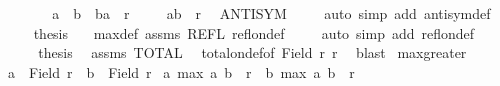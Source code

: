 \begin{isabellebody}
\isanewline
\ \ \isamarkupfalse%
\isanewline
\ \ \isacommand{{\isacharbraceleft}{\kern0pt}}\isamarkupfalse%
\isamarkupfalse%
\ {\isacharasterisk}{\kern0pt}{\isacharcolon}{\kern0pt}\ {\isachardoublequoteopen}a\ {\isasymnoteq}\ b\ {\isasymand}\ {\isacharparenleft}{\kern0pt}b{\isacharcomma}{\kern0pt}a{\isacharparenright}{\kern0pt}\ {\isasymin}\ r{\isachardoublequoteclose}\isanewline
\ \ \ \isamarkupfalse%
\ {\isachardoublequoteopen}{\isacharparenleft}{\kern0pt}a{\isacharcomma}{\kern0pt}b{\isacharparenright}{\kern0pt}\ {\isasymnotin}\ r{\isachardoublequoteclose}\ \isamarkupfalse%
\ ANTISYM\isanewline
\ \ \ \isamarkupfalse%
\ {\isacharparenleft}{\kern0pt}auto\ simp\ add{\isacharcolon}{\kern0pt}\ antisym{\isacharunderscore}{\kern0pt}def{\isacharparenright}{\kern0pt}\isanewline
\ \ \ \isamarkupfalse%
\ {\isacharquery}{\kern0pt}thesis\ \isamarkupfalse%
\ {\isacharasterisk}{\kern0pt}\ max{}{\isacharunderscore}{\kern0pt}def\ assms\ REFL\ refl{\isacharunderscore}{\kern0pt}on{\isacharunderscore}{\kern0pt}def\isanewline
\ \ \ \isamarkupfalse%
\ {\isacharparenleft}{\kern0pt}auto\ simp\ add{\isacharcolon}{\kern0pt}\ refl{\isacharunderscore}{\kern0pt}on{\isacharunderscore}{\kern0pt}def{\isacharparenright}{\kern0pt}\isanewline
\ \ \isacommand{{\isacharbraceright}{\kern0pt}}\isamarkupfalse%
\isanewline
\ \ \isamarkupfalse%
\ \isamarkupfalse%
\ {\isacharquery}{\kern0pt}thesis\ \isamarkupfalse%
\ assms\ TOTAL\isanewline
\ \ total{\isacharunderscore}{\kern0pt}on{\isacharunderscore}{\kern0pt}def{\isacharbrackleft}{\kern0pt}of\ {\isachardoublequoteopen}Field\ r{\isachardoublequoteclose}\ r{\isacharbrackright}{\kern0pt}\ \isamarkupfalse%
\ blast\isanewline
{}\isamarkupfalse%
%
\endisatagproof
{\isafoldproof}%
%
\isadelimproof
\isanewline
%
\endisadelimproof
\isanewline
{}\isamarkupfalse%
\ max{}{\isacharunderscore}{\kern0pt}greater{\isacharcolon}{\kern0pt}\isanewline
{}\ {\isachardoublequoteopen}a\ {\isasymin}\ Field\ r{\isachardoublequoteclose}\ \ {\isachardoublequoteopen}b\ {\isasymin}\ Field\ r{\isachardoublequoteclose}\isanewline
{}\ {\isachardoublequoteopen}{\isacharparenleft}{\kern0pt}a{\isacharcomma}{\kern0pt}\ max{}\ a\ b{\isacharparenright}{\kern0pt}\ {\isasymin}\ r\ {\isasymand}\ {\isacharparenleft}{\kern0pt}b{\isacharcomma}{\kern0pt}\ max{}\ a\ b{\isacharparenright}{\kern0pt}\ {\isasymin}\ r{\isachardoublequoteclose}\isanewline

\end{isabellebody}
